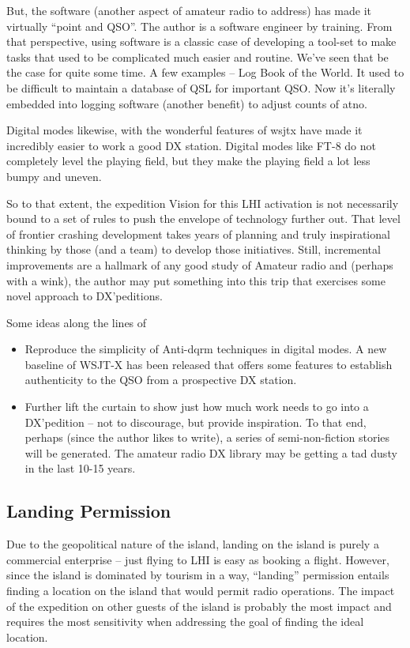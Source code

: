 \documentclass[11pt]{article}
\begin{document}
\par
But, the software
(another aspect of amateur radio to address) has made it virtually
``point and QSO''.  The author is a software engineer by training.
From that perspective, using software is a classic case of developing
a tool-set to make tasks that used to be complicated much easier and
routine.   We've seen that be the case for quite some time.  A few
examples -- Log Book of the World.   It used to be difficult to 
maintain a database of QSL for important QSO. Now it's literally
embedded into logging software (another benefit) to adjust
counts of {\gls{atno}}.
\par
Digital modes likewise, with the wonderful features of {\gls{wsjtx}}
have made it incredibly easier to work a good DX station.   Digital
modes like FT-8 do not completely level the playing field, but they
make the playing field a lot less bumpy and uneven.
\par
So to that extent, the expedition Vision for this LHI activation
is not necessarily bound to a set of rules to push the envelope of
technology further out.  That level of frontier crashing development
takes years of planning and truly inspirational thinking by those
(and a team) to develop those initiatives.   Still, incremental
improvements are a hallmark of any good study of Amateur radio and
(perhaps with a wink), the author may put something into this
trip that exercises some novel approach to DX'peditions.
\par
Some ideas along the lines of
\begin{itemize}
\item Reproduce the simplicity of Anti-{\gls{dqrm}} techniques in digital modes.
A new baseline of WSJT-X has been released that offers some features
to establish authenticity to the QSO from a prospective DX station.
\item Further lift the curtain to show just how much work needs to
go into a DX'pedition -- not to discourage, but provide inspiration.
To that end, perhaps (since the author likes to write), a series of 
semi-non-fiction stories will be generated.   The amateur radio
DX library may be getting a tad dusty in the last 10-15 years.
\end{itemize}

\subsection{Landing Permission}

Due to the geopolitical nature of the island, landing on the island is
purely a commercial enterprise -- just flying to LHI
is easy as booking a flight.  However, since the island is dominated
by tourism in a way, ``landing'' permission entails finding a location
on the island that would permit radio operations.   The impact
of the expedition on other guests of the island is probably the most impact
and requires the most sensitivity when addressing the goal of finding
the ideal location.
\end{document}
